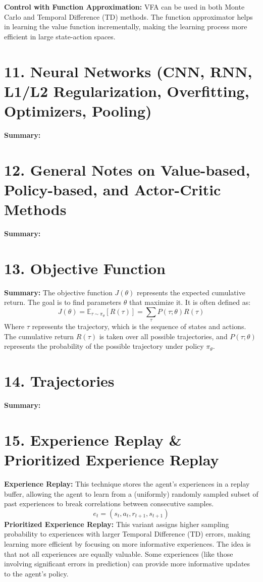 \documentclass[a4paper,10pt]{article}
\begin{document}
\begin{multicols}{2}
\noindent \textbf{Control with Function Approximation:} VFA can be used in both Monte Carlo and Temporal Difference (TD) methods. The function approximator helps in learning the value function incrementally, making the learning process more efficient in large state-action spaces.


\section*{11. Neural Networks (CNN, RNN, L1/L2 Regularization, Overfitting, Optimizers, Pooling)}
\textbf{Summary:} 

\section*{12. General Notes on Value-based, Policy-based, and Actor-Critic Methods}
\textbf{Summary:} 

\section*{13. Objective Function}
\textbf{Summary:} The objective function \( J(\theta) \) represents the expected cumulative return. The goal is to find parameters \( \theta \) that maximize it. It is often defined as:
\[
J(\theta) = \mathbb{E}_{\tau \sim \pi_\theta} [R(\tau)] = \sum_{\tau} P(\tau;\theta)R(\tau)
\]
Where \( \tau \) represents the trajectory, which is the sequence of states and actions. The cumulative return \( R(\tau) \) is taken over all possible trajectories, and \( P(\tau;\theta) \) represents the probability of the possible trajectory under policy \( \pi_\theta \).

\section*{14. Trajectories}
\textbf{Summary:} 

\section*{15. Experience Replay \& Prioritized Experience Replay}
\textbf{Experience Replay:} This technique stores the agent's experiences in a replay buffer, allowing the agent to learn from a (uniformly) randomly sampled subset of past experiences to break correlations between consecutive samples.
\[
e_t = (s_t, a_t, r_{t+1}, s_{t+1})
\]
\textbf{Prioritized Experience Replay:} This variant assigns higher sampling probability to experiences with larger Temporal Difference (TD) errors, making learning more efficient by focusing on more informative experiences. The idea is that not all experiences are equally valuable. Some experiences (like those involving significant errors in prediction) can provide more informative updates to the agent's policy.


\end{multicols}
\end{document}
